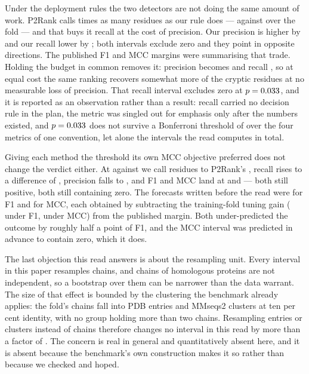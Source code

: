 \documentclass[11pt]{article}
\begin{document}
Under the deployment rules the two detectors are not doing the same amount of
work. P2Rank calls \FullCallRatio{} times as many residues as our rule does ---
\FullDeployedCalledPTwo{} against \FullDeployedCalledOurs{} over the fold --- and
that buys it recall at the cost of precision. Our precision is higher by
\FullDeployedPrecDelta{} \FullDeployedPrecCI{} and our recall lower by
\FullDeployedRecDelta{} \FullDeployedRecCI{}; both intervals exclude zero and
they point in opposite directions. The published F1 and MCC margins were
summarising that trade. Holding the budget in common removes it: precision
becomes \FullBudgetPrecDelta{} \FullBudgetPrecCI{} and recall
\FullBudgetRecDelta{} \FullBudgetRecCI{}, so at equal cost the same ranking
recovers somewhat more of the cryptic residues at no measurable loss of
precision. That recall interval excludes zero at \(p=0.033{}\), and it
is reported as an observation rather than a result: recall carried no decision
rule in the plan, the metric was singled out for emphasis only after the numbers
existed, and \(p=0.033{}\) does not survive a Bonferroni threshold of
\FullBonfAlpha{} over the four metrics of one convention, let alone the
\FullIntervals{} intervals the read computes in total.

Giving each method the threshold its own MCC objective preferred does not change
the verdict either. At \FullTunedMQOurs{} against \FullTunedMQPTwo{} we call
\FullTunedMCalledOurs{} residues to P2Rank's \FullTunedMCalledPTwo{}, recall
rises to a difference of \FullTunedMRecDelta{} \FullTunedMRecCI{}, precision
falls to \FullTunedMPrecDelta{} \FullTunedMPrecCI{}, and F1 and MCC land at
\FullTunedMFOneDelta{} \FullTunedMFOneCI{} and \FullTunedMMCCDelta{}
\FullTunedMMCCCI{} --- both still positive, both still containing zero. The
forecasts written before the read were \FullForecastFOne{} for F1 and
\FullForecastMCC{} for MCC, each obtained by subtracting the training-fold
tuning gain (\TrainGainF{} under F1, \TrainGainM{} under MCC) from the published
margin. Both under-predicted the outcome by roughly half a point of F1, and the
MCC interval was predicted in advance to contain zero, which it does.

The last objection this read answers is about the resampling unit. Every interval
in this paper resamples chains, and chains of homologous proteins are not
independent, so a bootstrap over them can be narrower than the data warrant. The
size of that effect is bounded by the clustering the benchmark already applies:
the fold's \FullGroupsChain{} chains fall into \FullGroupsPdb{} PDB entries and
\FullGroupsClu{} MMseqs2 clusters at ten per cent identity, with no group holding
more than two chains. Resampling entries or clusters instead of chains therefore
changes no interval in this read by more than a factor of
\FullWidestClusterRatio{}. The concern is real in general and quantitatively
absent here, and it is absent because the benchmark's own construction makes it
so rather than because we checked and hoped.
\end{document}
